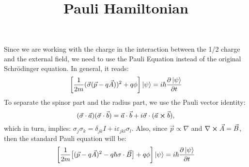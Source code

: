 \documentclass[a4paper]{article}
\title{Pauli Hamiltonian}
\begin{document}
	\maketitle
Since we are working with the charge in the interaction between the 1/2 charge and the external field, we need to use the Pauli Equation instead of the original Schrödinger equation. In general, it reads:
\begin{equation}
	\bigg[\frac{1}{2m} (\vec{\sigma}(\vec{p} - q\vec{A}))^2 + q\phi\bigg] \ket{\psi} = i\hbar\pdv{\ket{\psi}}{t}
\end{equation}
To separate the spinor part and the radius part, we use the Pauli vector identity:
\begin{equation}
	(\vec{\sigma}\cdot\vec{a})(\vec{\sigma}\cdot\vec{b}) = \vec{a}\cdot\vec{b} + i \vec{\sigma}\cdot(\vec{a} \cross \vec{b}),
\end{equation}
which in turn, implies: \(\sigma_j \sigma_k = \delta_{jk}I + i \varepsilon_{jkl}\sigma_l\). Also, since \(\vec{p} \propto \nabla\) and \(\nabla \cross \vec{A} = \vec{B}\), then the standard Pauli equation will be:
\begin{equation}
	\bigg[\frac{1}{2m} \big[(\vec{p} - q\vec{A})^2 - q\hbar \sigma \cdot \vec{B}\big] + q\phi\bigg] \ket{\psi} = i\hbar \pdv{\ket{\psi}}{t}
\end{equation}
\end{document}
